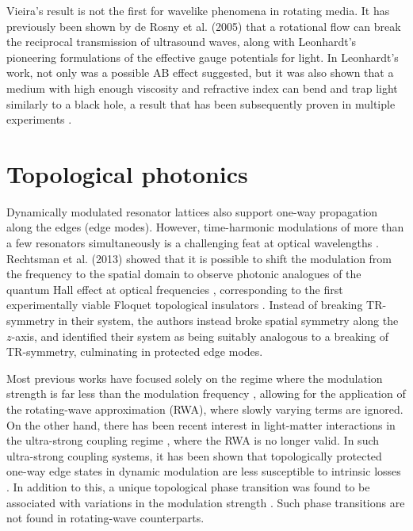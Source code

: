  Vieira's result is not the first for wavelike phenomena in rotating media. It has previously been shown by de Rosny et al. (2005) that a rotational flow can break the reciprocal transmission of ultrasound waves, along with Leonhardt's \cite{Leonhardt1999, Leonhardt2000c, Leonhardt2000a} pioneering formulations of the effective gauge potentials for light. In Leonhardt's work, not only was a possible AB effect suggested, but it was also shown that a medium with high enough viscosity and refractive index can bend and trap light similarly to a black hole, a result that has been subsequently proven in multiple experiments \cite{Genov2011}.
 
\section{Topological photonics \label{topology}}
\label{sec:topology}

Dynamically modulated resonator lattices also support one-way propagation along the edges (edge modes). However, time-harmonic modulations of more than a few resonators simultaneously is a challenging feat at optical wavelengths \cite{Tzuang2014}. Rechtsman et al. (2013) showed that it is possible to shift the modulation from the frequency to the spatial domain to observe photonic analogues of the quantum Hall effect at optical frequencies \cite{Rechtsman2013b}, corresponding to the first experimentally viable Floquet topological insulators \cite{Lindner2011}. Instead of breaking TR-symmetry in their system, the authors instead broke spatial symmetry along the $z$-axis, and identified their system as being suitably analogous to a breaking of TR-symmetry, culminating in protected edge modes. 

Most previous works have focused solely on the regime where the modulation strength is far less than the modulation frequency \cite{Lee2017a}, allowing for the application of the rotating-wave approximation (RWA), where slowly varying terms are ignored. On the other hand, there has been recent interest in light-matter interactions in the ultra-strong coupling regime \cite{Fedortchenko2016,Hirokawa2017}, where the RWA is no longer valid. In such ultra-strong coupling systems, it has been shown that topologically protected one-way edge states in dynamic modulation are less susceptible to intrinsic losses \cite{Fan2015}. In addition to this, a unique topological phase transition was found to be associated with variations in the modulation strength \cite{Yuan2015a}. Such phase transitions are not found in rotating-wave counterparts. 

